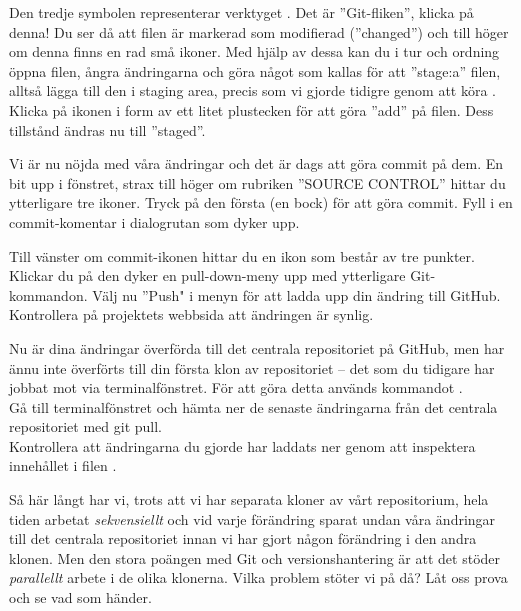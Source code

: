 \begin{Datorarbete}
	Den tredje symbolen representerar verktyget . Det är ''Git-fliken'', klicka på denna! Du ser då att filen   är markerad som modifierad (''changed'') och till höger om denna finns en rad små ikoner. Med hjälp av dessa kan du i tur och ordning öppna filen, ångra ändringarna och göra något som kallas för att ''stage:a'' filen, alltså lägga till den i staging area, precis som vi gjorde tidigre genom att köra . Klicka på ikonen i form av ett litet plustecken för att göra ''add'' på filen. Dess tillstånd ändras nu till ''staged''.

	Vi är nu  nöjda med våra ändringar och det är dags att göra commit på dem. En bit upp i fönstret, strax till höger om rubriken ''SOURCE CONTROL'' hittar du ytterligare tre ikoner. Tryck på den första (en bock) för att göra commit. Fyll i en commit-komentar i dialogrutan som dyker upp.

	\item Till vänster om commit-ikonen hittar du en ikon som består av tre punkter. Klickar du på den dyker en pull-down-meny upp med ytterligare Git-kommandon. Välj nu ''Push" i menyn för att ladda upp din ändring till GitHub. Kontrollera på projektets webbsida att ändringen är synlig.

	\item Nu är dina ändringar överförda till det centrala repositoriet på GitHub, men har ännu inte överförts till din första klon av repositoriet -- det som du tidigare har jobbat mot via terminalfönstret. För att göra detta används kommandot .
	\\


	\code{[\ref{git-pull-term}]} Gå till terminalfönstret och hämta ner de senaste ändringarna från det centrala repositoriet med git pull.
	\\


	Kontrollera att ändringarna du gjorde har laddats ner genom att inspektera innehållet i filen .

	\item Så här långt har vi, trots att vi har separata kloner av vårt repositorium, hela tiden arbetat \emph{sekvensiellt} och vid varje förändring sparat undan våra ändringar till det centrala repositoriet innan vi har gjort någon förändring i den andra klonen. Men den stora poängen med Git och versionshantering är att det stöder \emph{parallellt} arbete i de olika klonerna. Vilka problem stöter vi på då? Låt oss prova och se vad som händer.


\end{Datorarbete}
